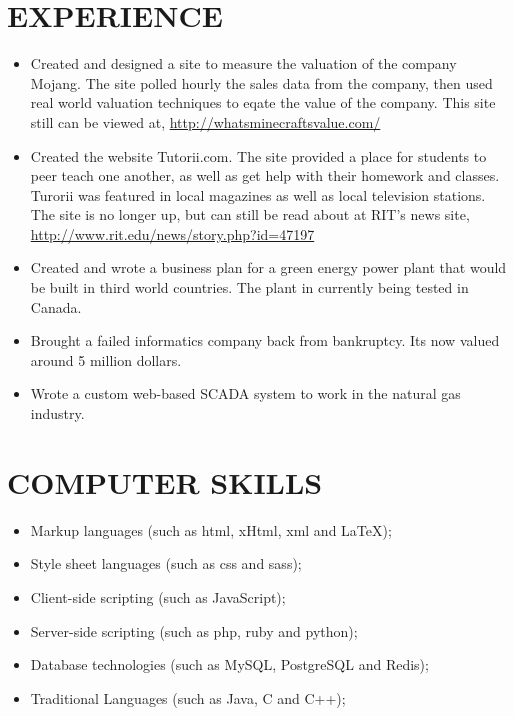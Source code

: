 \documentclass[10pt]{article}
\newcommand{%
	\thumbnail}[2]{
		\raggedleft\hfill{\href{#1}
			{\trick \raisebox{-3pt}{.}
				\fbox{
			\texttt{[image: \#2]}}
			\raisebox{70pt}{.}}}
			}
\begin{document}
\begin{minipage}[t]{0.8\textwidth}
\section{EXPERIENCE}
\vspace{0pt}
\begin{itemize}[leftmargin=1cm, itemsep=0pt, topsep=5pt] \Text\raggedright
	\item Created and designed a site to measure the valuation of the company Mojang. The site polled hourly the sales data from the company, then used real world valuation techniques to eqate the value of the company. This site still can be viewed at, \url{http://whatsminecraftsvalue.com/}

	\item Created the website Tutorii.com. The site provided a place for students to peer teach one another, as well as get help with their homework and classes. Turorii was featured in local magazines as well as local television stations. The site is no longer up, but can still be read about at RIT's news site, \url{http://www.rit.edu/news/story.php?id=47197} 

	\item Created and wrote a business plan for a green energy power plant that would be built in third world countries.  The plant in currently being tested in Canada.

  \item Brought a failed informatics company back from bankruptcy. Its now valued around 5 million dollars.

  \item Wrote a custom web-based SCADA system to work in the natural gas industry.

\end{itemize}
\vspace{10pt}
\section{COMPUTER SKILLS}
\begin{itemize}[leftmargin=1cm, itemsep=0pt, topsep=5pt]\Text
\item Markup languages (such as {\TextSC html}, {\TextSC xHtml}, {\TextSC xml} and \LaTeX);
\item Style sheet languages (such as {\TextSC css} and {\TextSC sass});
\item Client-side scripting (such as JavaScript);
\item Server-side scripting (such as {\TextSC php}, {\TextSC ruby} and {\TextSC python});
\item Database technologies (such as MySQL, PostgreSQL and Redis);
\item Traditional Languages (such as Java, C and C++);
\end{itemize}
\vspace{10pt}

\end{minipage}
\end{document}

